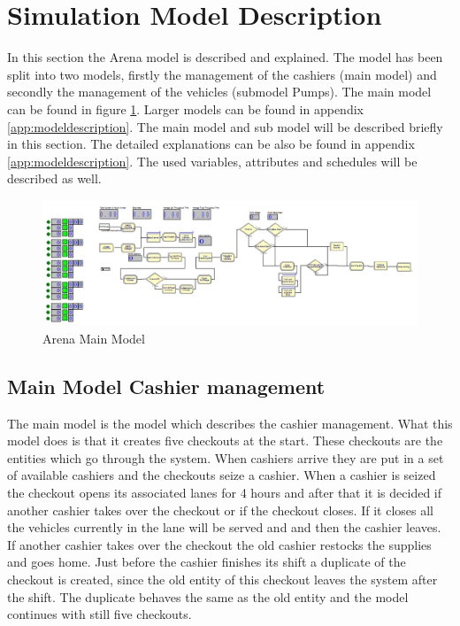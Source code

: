 \section{Simulation Model Description}

In this section the Arena model is described and explained. The model has been split into two models, firstly the management of the cashiers (main model) and secondly the management of the vehicles (submodel Pumps). The main model can be found in figure \ref{fig:main}. Larger models can be found in appendix \ref{app:modeldescription}. The main model and sub model will be described briefly in this section. The detailed explanations can be also be found in appendix \ref{app:modeldescription}.  The used variables, attributes and schedules will be described as well.
\begin{figure}[h!]
\begin{center}
	\includegraphics[scale=0.6]{images/model-description/main}
	\caption{Arena Main Model}
	\label{fig:main}
\end{center}
\end{figure}
\subsection{Main Model Cashier management}
The main model is the model which describes the cashier management. What this model does is that it creates five checkouts at the start. These checkouts are the entities which go through the system. When cashiers arrive they are put in a set of available cashiers and the checkouts seize a cashier. When a cashier is seized the checkout opens its associated lanes for 4 hours and after that it is decided if another cashier takes over the checkout or if the checkout closes. If it closes all the vehicles currently in the lane will be served and and then the cashier leaves. If another cashier takes over the checkout the old cashier restocks the supplies and goes home. Just before the cashier finishes its shift a duplicate of the checkout is created, since the old entity of this checkout leaves the system after the shift. The duplicate behaves the same as the old entity and the model continues with still five checkouts. 

